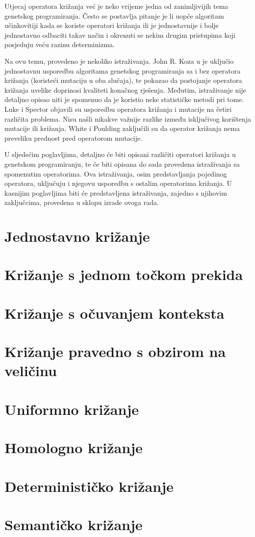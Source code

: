 Utjecaj operatora križanja već je neko vrijeme jedna od zanimljivijih tema genetskog programiranja. Često se postavlja pitanje je li uopće algoritam učinkovitiji kada se koriste operatori križanja ili je jednostavnije i bolje jednostavno odbaciti takav način i okrenuti se nekim drugim pristupima koji posjeduju veću razinu determinizma.

Na ovu temu, provedeno je nekoliko istraživanja. John R. Koza u \cite{koza} je uključio jednostavnu usporedbu algoritama genetskog programiranja sa i bez operatora križanja (koristeći mutaciju u oba slučaja), te pokazao da postojanje operatora križanja uvelike doprinosi kvaliteti konačnog rješenja. Međutim, istraživanje nije detaljno opisao niti je spomenuo da je koristio neke statističke metodi pri tome. Luke i Spector \cite{luke} objavili su usporedbu operatora križanja i mutacije na četiri različita problema. Nisu našli nikakve važnije razlike između isključivog korištenja mutacije ili križanja. White i Poulding \cite{rigo} zaključili su da operator križanja nema preveliku prednost pred operatorom mutacije. 

U sljedećim poglavljima, detaljno će biti opisani različiti operatori križanja u genetskom programiranju, te će biti opisana do sada provedena istraživanja sa spomenutim operatorima. Ova istraživanja, osim predstavljanja pojedinog operatora, uključuju i njegovu usporedbu s ostalim operatorima križanja. U kasnijim poglavljima biti će predstavljena istraživanja, zajedno s njihovim zaključcima, provedena u sklopu izrade ovoga rada.

\section{Jednostavno križanje}


\section{Križanje s jednom točkom prekida}


\section{Križanje s očuvanjem konteksta}


\section{Križanje pravedno s obzirom na veličinu}


\section{Uniformno križanje}


\section{Homologno križanje}


\section{Determinističko križanje}


\section{Semantičko križanje}
